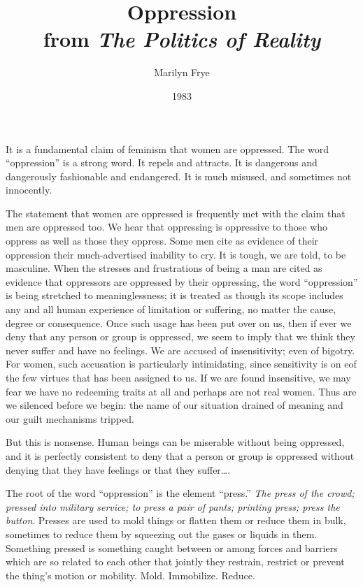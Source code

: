 \documentclass{article}
\title{Oppression\\from \emph{The Politics of Reality}}
\author{Marilyn Frye}
\date{1983}
\begin{document}
\maketitle

It is a fundamental claim of feminism that women are oppressed. The word
``oppression'' is a strong word. It repels and attracts. It is dangerous and
dangerously fashionable and endangered. It is much misused, and sometimes not
innocently.

The statement that women are oppressed is frequently met with the claim that
men are oppressed too. We hear that oppressing is oppressive to those who
oppress as well as those they oppress. Some men cite as evidence of their
oppression their much-advertised inability to cry. It is tough, we are told, to
be masculine. When the stresses and frustrations of being a man are cited as
evidence that oppressors are oppressed by their oppressing, the word
``oppression'' is being stretched to meaninglessness; it is treated as though
its scope includes any and all human experience of limitation or suffering, no
matter the cause, degree or consequence. Once such usage has been put over on
us, then if ever we deny that any person or group is oppressed, we seem to
imply that we think they never suffer and have no feelings. We are accused of
insensitivity; even of bigotry. For women, such accusation is particularly
intimidating, since sensitivity is on eof the few virtues that has been
assigned to us. If we are found insensitive, we may fear we have no redeeming
traits at all and perhaps are not real women. Thus are we silenced before we
begin: the name of our situation drained of meaning and our guilt mechanisms
tripped.

But this is nonsense. Human beings can be miserable without being oppressed,
and it is perfectly consistent to deny that a person or group is oppressed
without denying that they have feelings or that they suffer\ldots{}.

The root of the word ``oppression'' is the element ``press.'' \emph{The press
of the crowd; pressed into military service; to press a pair of pants; printing
press; press the button}. Presses are used to mold things or flatten them or
reduce them in bulk, sometimes to reduce them by squeezing out the gases or
liquids in them. Something pressed is something caught between or among forces
and barriers which are so related to each other that jointly they restrain,
restrict or prevent the thing's motion or mobility. Mold. Immobilize. Reduce.
\end{document}
